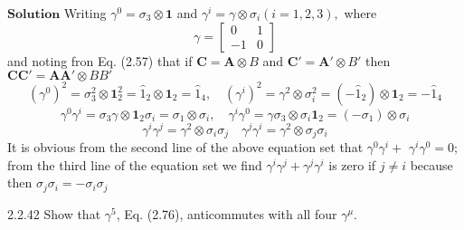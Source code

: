 \documentclass{article}
\begin{document}
\begin{flushleft}
$\boxed{\textbf{Solution}}$  Writing $\gamma^{0}=\sigma_{3} \otimes \mathbf{1}$ and $\gamma^{i}=\gamma \otimes \sigma_{i}(i=1,2,3),$ where
$$
\gamma=\begin{bmatrix}{0} & {1} \\ {-1} & {0}\end{bmatrix}
$$
and noting fron Eq. (2.57) that if $\mathbf{C}=\mathbf{A} \otimes B$ and $\mathbf{C}'=\mathbf{A}' \otimes B'$ then
$\mathbf{C} \mathbf{C}'=\mathbf{A} \mathbf{A}' \otimes B B'$
$$\left(\gamma^{0}\right)^{2}=\sigma_{3}^{2} \otimes \mathbf{1}_{2}^{2}=\hat{1}_{2} \otimes \mathbf{1}_{2}=\hat{1}_{4}, \quad\left(\gamma^{i}\right)^{2}=\gamma^{2} \otimes \sigma_{i}^{2}=\left(-\hat{1}_{2}\right) \otimes \mathbf{1}_{2}=-\hat{1}_{4}$$
$$\gamma^{0} \gamma^{i}=\sigma_{3} \gamma \otimes \mathbf{1}_{2} \sigma_{i}=\sigma_{1} \otimes \sigma_{i}, \quad \gamma^{i} \gamma^{0}=\gamma \sigma_{3} \otimes \sigma_{i} \mathbf{1}_{2}=\left(-\sigma_{1}\right) \otimes \sigma_{i}$$
$$\gamma^{i} \gamma^{j}=\gamma^{2} \otimes \sigma_{i} \sigma_{j} \quad \gamma^{j} \gamma^{i}=\gamma^{2} \otimes \sigma_{j} \sigma_{i}$$
It is obvious from the second line of the above equation set that $\gamma^{0} \gamma^{i}+$
$\gamma^{i} \gamma^{0}=0 ;$ from the third line of the equation set we find $\gamma^{i} \gamma^{j}+\gamma^{j} \gamma^{i}$ is zero if $j \neq i$ because then $\sigma_{j} \sigma_{i}=-\sigma_{i} \sigma_{j}$

\newpage

\begin{mybox}{2.2.42}
Show that $\gamma^{5}$, Eq. (2.76), anticommutes with all four $\gamma^{\mu}$.
\end{mybox}



\end{flushleft}
\end{document}
